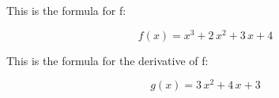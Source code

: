 \documentclass[11]{article}
\begin{document}
This is the formula for f:

$$f\left(x\right)=x^3+2\,x^2+3\,x+4$$

This is the formula for the derivative of f:

$$g\left(x\right)=3\,x^2+4\,x+3$$
\end{document}
